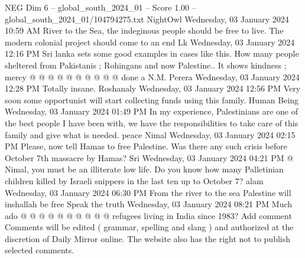 \begin{textsample}{NEG Dim 6 – global\_south\_2024\_01 – Score 1.00 – global\_south\_2024\_01/104794275.txt}
NightOwl Wednesday, 03 January 2024 10:59 AM River to the Sea, the indeginous people should be free to live.
The modern colonial project should come to an end Lk Wednesday, 03 January 2024 12:16 PM Sri lanka sets some good examples in cases like this.
How many people sheltered from Pakistanis ; Rohingans and now Palestine..
It shows kindness ; mercy @ @ @ @ @ @ @ @ @ @ done a N.M.
Perera Wednesday, 03 January 2024 12:28 PM Totally insane.
Roshanaly Wednesday, 03 January 2024 12:56 PM Very soon some opportunist will start collecting funds using this family.
Human Being Wednesday, 03 January 2024 01:49 PM In my experience, Palestinians are one of the best people I have been with, we have the responsibilities to take care of this family and give what is needed. peace Nimal Wednesday, 03 January 2024 02:15 PM Please, now tell Hamas to free Palestine.
Was there any such crisis before October 7th massacre by Hamas?
Sri Wednesday, 03 January 2024 04:21 PM @ Nimal, you must be an illiterate low life.
Do you know how many Palletinian children killed by Israeli snippers in the last ten up to October 7? alam Wednesday, 03 January 2024 06:30 PM From the river to the sea Palestine will inshallah be free Speak the truth Wednesday, 03 January 2024 08:21 PM Much ado @ @ @ @ @ @ @ @ @ @ refugees living in India since 1983?
Add comment Comments will be edited ( grammar, spelling and slang ) and authorized at the discretion of Daily Mirror online.
The website also has the right not to publish selected comments.

\end{textsample}
